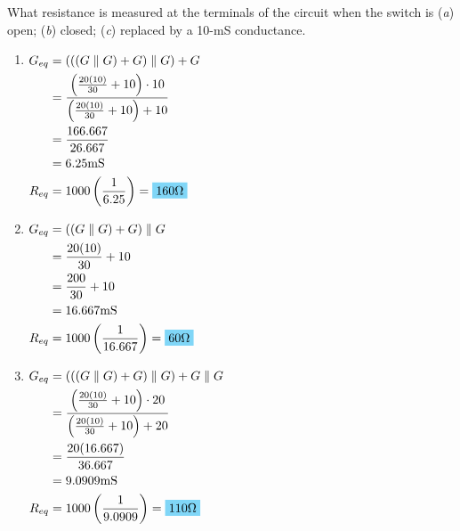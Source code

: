 What resistance is measured at the terminals of the circuit when the switch is (\emph{a}) open; (\emph{b}) closed; (\emph{c}) replaced by a 10-mS conductance.
\begin{enumerate}[leftmargin=2cm,labelsep=.5cm,label=\bfseries\alph*)]
	\item $
	\begin{aligned}[t]
	G_{eq} &= (((G\parallel G)+G) \parallel G)+G \\
	&= \frac{\left(\frac{20(10)}{30} + 10\right)\cdot 10}{\left(\frac{20(10)}{30} + 10\right) + 10} \\
	&= \frac{166.667}{26.667} \\
	&= 6.25\qw{\milli\siemens}  \\
	R_{eq} &= 1000\left(\frac{1}{6.25}\right) = \hlbox{160\qw{\ohm}}
	\end{aligned} $
	\\[1cm]
	
	\item $
	\begin{aligned}[t]
	G_{eq} &= ((G\parallel G)+G) \parallel G \\
	&= \frac{20(10)}{30} + 10 \\
	&= \frac{200}{30}+10 \\
	&= 16.667\qw{\milli\siemens}  \\
	R_{eq} &= 1000\left(\frac{1}{16.667}\right) = \hlbox{60\qw{\ohm}}
	\end{aligned} $
	\\[1cm]
	
	\item $
	\begin{aligned}[t]
	G_{eq} &= (((G\parallel G)+G) \parallel G)+G\parallel G \\
	&= \frac{\left(\frac{20(10)}{30} + 10\right)\cdot 20}{\left(\frac{20(10)}{30} + 10\right) + 20} \\
	&= \frac{20(16.667)}{36.667} \\
	&= 9.0909\qw{\milli\siemens}  \\
	R_{eq} &= 1000\left(\frac{1}{9.0909}\right) = \hlbox{110\qw{\ohm}}
	\end{aligned} $
	\\[1cm]
\end{enumerate}